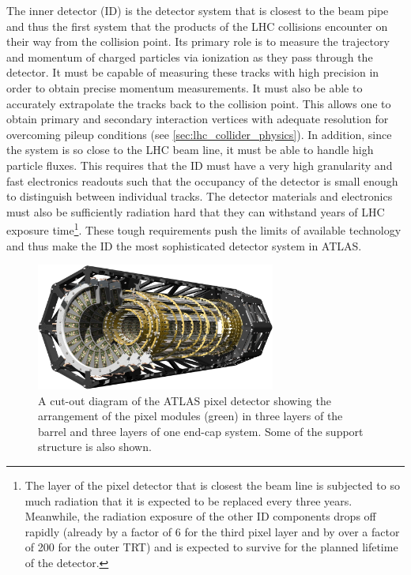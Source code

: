 The inner detector (ID) is the 
detector system that is closest to the beam pipe and thus the
first system that the products of the LHC collisions encounter
on their way from the collision point. Its primary role is 
to measure the trajectory and momentum of charged particles
via ionization as they pass through the detector.
It must be capable of measuring these tracks with high precision
in order to obtain precise momentum measurements. It must
also be able
to accurately extrapolate the tracks back to the collision point.
This allows one 
to obtain primary and secondary interaction vertices with adequate
resolution for overcoming pileup 
conditions (see \sec\ref{sec:lhc_collider_physics}). In addition,
since the system is so close to the LHC beam line, it
must be able to handle high particle fluxes. This requires that
the ID must have a very high granularity and fast electronics
readouts such that the occupancy of the
detector is small enough to distinguish between individual tracks. 
The detector materials and electronics must also be sufficiently radiation
hard that they can withstand years of LHC 
exposure time\footnote{The layer of the pixel detector that is closest
the beam line is subjected to so much radiation that it is expected to be replaced
every three years.  Meanwhile, the radiation exposure of the other ID
components drops off rapidly (already by a factor of 6 for the third
pixel layer and by over a factor of 200 for the outer TRT) and is 
expected to survive for the planned lifetime of the detector.}.
These tough requirements push the limits of available technology and thus
make the ID the most sophisticated detector system in ATLAS.



\begin{figure}[htb]
\centering
\includegraphics[width=0.7\textwidth]{figures/atlas/pixel.eps}
\caption{A cut-out diagram of the ATLAS pixel detector showing 
the arrangement of the pixel modules (green) in three layers of the barrel
and three layers of one end-cap system. Some of the support structure is
also shown.}
\label{fig:atlas_pixel}
\end{figure}

